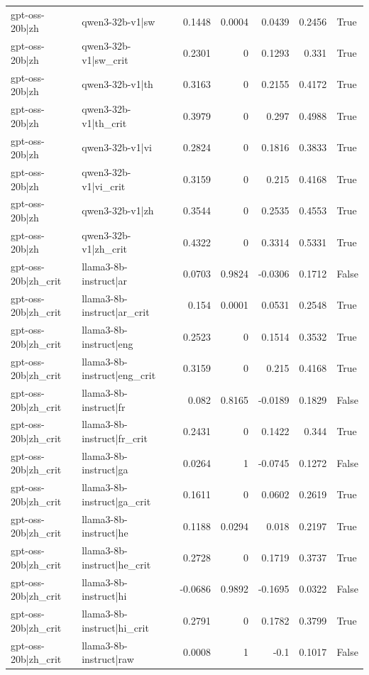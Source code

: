\begin{table}
\begin{tabular}{l l r r r r l}
gpt-oss-20b|zh & qwen3-32b-v1|sw & 0.1448 & 0.0004 & 0.0439 & 0.2456 & True \\
gpt-oss-20b|zh & qwen3-32b-v1|sw_crit & 0.2301 & 0 & 0.1293 & 0.331 & True \\
gpt-oss-20b|zh & qwen3-32b-v1|th & 0.3163 & 0 & 0.2155 & 0.4172 & True \\
gpt-oss-20b|zh & qwen3-32b-v1|th_crit & 0.3979 & 0 & 0.297 & 0.4988 & True \\
gpt-oss-20b|zh & qwen3-32b-v1|vi & 0.2824 & 0 & 0.1816 & 0.3833 & True \\
gpt-oss-20b|zh & qwen3-32b-v1|vi_crit & 0.3159 & 0 & 0.215 & 0.4168 & True \\
gpt-oss-20b|zh & qwen3-32b-v1|zh & 0.3544 & 0 & 0.2535 & 0.4553 & True \\
gpt-oss-20b|zh & qwen3-32b-v1|zh_crit & 0.4322 & 0 & 0.3314 & 0.5331 & True \\
gpt-oss-20b|zh_crit & llama3-8b-instruct|ar & 0.0703 & 0.9824 & -0.0306 & 0.1712 & False \\
gpt-oss-20b|zh_crit & llama3-8b-instruct|ar_crit & 0.154 & 0.0001 & 0.0531 & 0.2548 & True \\
gpt-oss-20b|zh_crit & llama3-8b-instruct|eng & 0.2523 & 0 & 0.1514 & 0.3532 & True \\
gpt-oss-20b|zh_crit & llama3-8b-instruct|eng_crit & 0.3159 & 0 & 0.215 & 0.4168 & True \\
gpt-oss-20b|zh_crit & llama3-8b-instruct|fr & 0.082 & 0.8165 & -0.0189 & 0.1829 & False \\
gpt-oss-20b|zh_crit & llama3-8b-instruct|fr_crit & 0.2431 & 0 & 0.1422 & 0.344 & True \\
gpt-oss-20b|zh_crit & llama3-8b-instruct|ga & 0.0264 & 1 & -0.0745 & 0.1272 & False \\
gpt-oss-20b|zh_crit & llama3-8b-instruct|ga_crit & 0.1611 & 0 & 0.0602 & 0.2619 & True \\
gpt-oss-20b|zh_crit & llama3-8b-instruct|he & 0.1188 & 0.0294 & 0.018 & 0.2197 & True \\
gpt-oss-20b|zh_crit & llama3-8b-instruct|he_crit & 0.2728 & 0 & 0.1719 & 0.3737 & True \\
gpt-oss-20b|zh_crit & llama3-8b-instruct|hi & -0.0686 & 0.9892 & -0.1695 & 0.0322 & False \\
gpt-oss-20b|zh_crit & llama3-8b-instruct|hi_crit & 0.2791 & 0 & 0.1782 & 0.3799 & True \\
gpt-oss-20b|zh_crit & llama3-8b-instruct|raw & 0.0008 & 1 & -0.1 & 0.1017 & False \\

\end{tabular}
\end{table}
